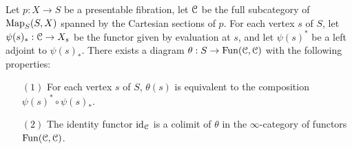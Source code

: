 \begin{lemma}\label{steakknife}
Let $p: X \rightarrow S$ be a presentable fibration, let $\operatorname{\mathcal{C}}$ 
be the full subcategory of $\operatorname{{Map}}_{S}(S,X)$ spanned by the Cartesian sections of $p$. For
each vertex $s$ of $S$, let $\psi(s)_{\ast}: \operatorname{\mathcal{C}} \rightarrow X_{s}$ be the functor given by evaluation at $s$, and let $\psi(s)^{\ast}$ be a left adjoint to $\psi(s)_{\ast}$. There
exists a diagram $\theta: S \rightarrow \operatorname{Fun}(\operatorname{\mathcal{C}}, \operatorname{\mathcal{C}})$ with the following properties:
\begin{itemize}
\item[$(1)$] For each vertex $s$ of $S$, $\theta(s)$ is equivalent to the composition
$\psi(s)^{\ast} \circ \psi(s)_{\ast}$.
\item[$(2)$] The identity functor $\operatorname{id}_{\operatorname{\mathcal{C}}}$ is a colimit of $\theta$ in the $\infty$-category of functors $\operatorname{Fun}(\operatorname{\mathcal{C}}, \operatorname{\mathcal{C}})$. 
\end{itemize}
\end{lemma}


